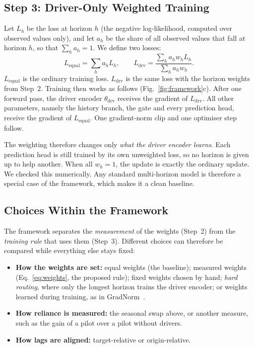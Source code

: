 \documentclass[conference]{IEEEtran}
\begin{document}
\subsection{Step 3: Driver-Only Weighted Training}

Let $L_h$ be the loss at horizon $h$ (the negative log-likelihood, computed over observed values only), and let $a_h$ be the share of all observed values that fall at horizon $h$, so that $\sum_h a_h = 1$. We define two losses:
\begin{equation}
L_{\mathrm{equal}} = \sum_h a_h L_h, \qquad
L_{\mathrm{drv}} = \frac{\sum_h a_h w_h L_h}{\sum_h a_h w_h}. \label{eq:loss}
\end{equation}
$L_{\mathrm{equal}}$ is the ordinary training loss. $L_{\mathrm{drv}}$ is the same loss with the horizon weights from Step~2. Training then works as follows (Fig.~\ref{fig:framework}c). After one forward pass, the driver encoder $\theta_{\mathrm{drv}}$ receives the gradient of $L_{\mathrm{drv}}$. All other parameters, namely the history branch, the gate and every prediction head, receive the gradient of $L_{\mathrm{equal}}$. One gradient-norm clip and one optimiser step follow.

The weighting therefore changes only \emph{what the driver encoder learns}. Each prediction head is still trained by its own unweighted loss, so no horizon is given up to help another. When all $w_h = 1$, the update is exactly the ordinary update. We checked this numerically. Any standard multi-horizon model is therefore a special case of the framework, which makes it a clean baseline.

\subsection{Choices Within the Framework}

The framework separates the \emph{measurement} of the weights (Step~2) from the \emph{training rule} that uses them (Step~3). Different choices can therefore be compared while everything else stays fixed:
\begin{itemize}
\item \textbf{How the weights are set:} equal weights (the baseline); measured weights (Eq.~\eqref{eq:weights}, the proposed rule); fixed weights chosen by hand; \emph{hard routing}, where only the longest horizon trains the driver encoder; or weights learned during training, as in GradNorm~\cite{chen2018gradnorm}.
\item \textbf{How reliance is measured:} the seasonal swap above, or another measure, such as the gain of a pilot over a pilot without drivers.
\item \textbf{How lags are aligned:} target-relative or origin-relative.
\end{itemize}
\end{document}
